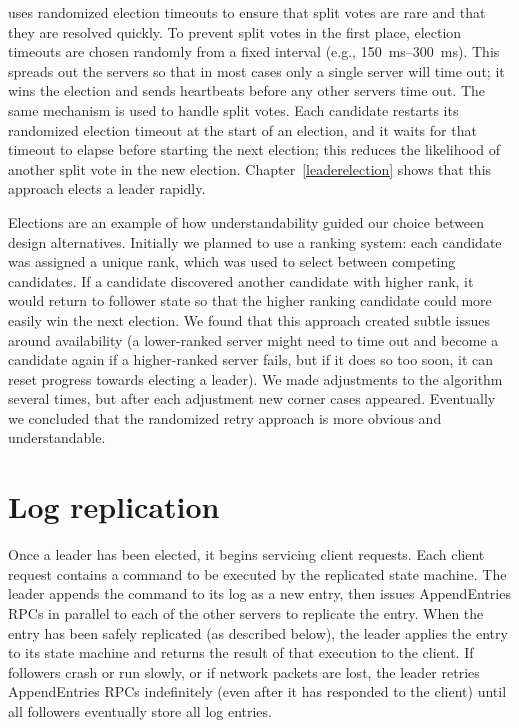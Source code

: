 \name{} uses randomized election timeouts to ensure that split votes
are rare and that they are resolved quickly. To prevent split
votes in the first place, election timeouts are chosen randomly
from a fixed interval (e.g., \SIrange{150}{300}{\milli\second}).
This spreads out the servers
so that in most cases only a single server will time out; it wins the
election and sends heartbeats before any other servers time out.
The same mechanism is used to handle split votes. Each candidate
restarts its randomized election timeout at the start of an election,
and it waits for that timeout to elapse before starting the
next election; this reduces the likelihood of
another split vote in the new election.
Chapter~\ref{leaderelection} shows that this approach
elects a leader rapidly.


Elections are an example of how understandability guided
our choice between design alternatives. Initially we planned to use
a ranking system: each candidate was assigned a unique
rank, which was used to select between competing candidates.
If a candidate discovered another candidate with higher
rank, it would return to follower state so that the
higher ranking candidate could more easily win the next election.
We found that this approach
created subtle issues around availability
(a lower-ranked server might need to time out and become a
candidate again if a higher-ranked server fails, but if it does so too
soon, it can reset progress towards electing a leader).
We made adjustments to the algorithm
several times, but after each adjustment new corner cases appeared.
Eventually we concluded that the randomized retry approach is more
obvious and understandable.

\section{Log replication}
\label{basicraft:logreplication}

Once a leader has been elected, it begins servicing client requests.
Each client request contains a
command to be executed by the replicated state machine.
The leader appends the command to its log as a new entry, then issues
AppendEntries RPCs in parallel to each of the other servers to
replicate the entry.
When the entry has been safely replicated (as described below),
the leader
applies the entry to its state machine and
returns the result of
that execution to the client. If followers crash or run slowly, or
if network packets are lost, the leader retries AppendEntries RPCs
indefinitely (even after it has responded to the client)
until all followers eventually store all log entries.

